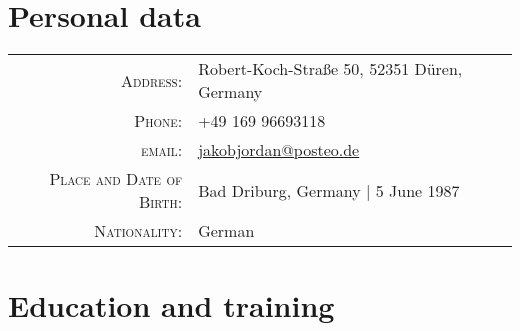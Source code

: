 \documentclass[a4paper,10pt]{article}
\begin{document}
\pagestyle{empty}

\par{\bigskip\par}

\section{Personal data}

\begin{tabular}{rl}
\textsc{Address:} & Robert-Koch-Stra\ss e 50, 52351 D\"uren, Germany \\
\textsc{Phone:} & +49 169 96693118\\
\textsc{email:} & \href{mailto:jakobjordan@posteo.de}{jakobjordan@posteo.de} \\
\textsc{Place and Date of Birth:} & Bad Driburg, Germany | 5 June 1987 \\
\textsc{Nationality:} & German
\end{tabular}


\section{Education and training}
\end{document}
